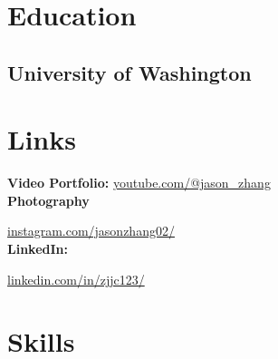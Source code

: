 \documentclass[]{main}
\begin{document}
%
%

%
%

%
%

\begin{minipage}[t]{0.33\textwidth} 


\section{Education} 

\subsection{University of Washington}
\sectionsep




\section{Links} 
\textbf{Video Portfolio:} 
\href{https://www.youtube.com/@jason\_zhang}{youtube.com/@jason\_zhang} \\

\textbf{Photography}

\href{https://www.instagram.com/jasonzhang02/}{instagram.com/jasonzhang02/} \\

\textbf{LinkedIn:} 

\href{https://www.linkedin.com/in/zjjc123/}{linkedin.com/in/zjjc123/} \\
\sectionsep


\section{Skills}


\end{minipage}
\end{document}
